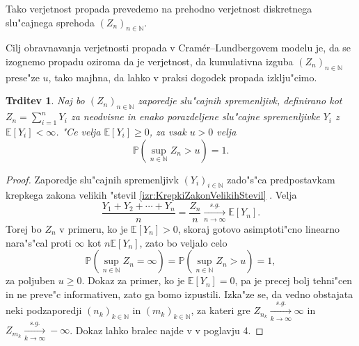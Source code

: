 \documentclass[12pt, a4paper, reqno]{amsart}
\theoremstyle{definition}
\theoremstyle{plain}
\newtheorem{trditev}[definicija]{Trditev}
\newcommand{\N}{\mathbb{N}}
\newcommand{\E}{\mathbb{E}}
\newcommand{\Prob}{\mathbb{P}}
\newcommand{\1}{\mathds{1}}
\newcommand*{\refPriloga}[1]{%
  \begingroup
    \hypersetup{
      linkcolor=red,
      linkbordercolor=red,
    }%
    \ref{#1}%
  \endgroup
}
\begin{document}
        Tako verjetnost propada prevedemo na prehodno verjetnost diskretnega slu"cajnega 
        sprehoda $(Z_n)_{n\in\N}$.
        
        Cilj obravnavanja verjetnosti propada v 
        Cramér--Lundbergovem modelu je, da se izognemo propadu oziroma da je verjetnost, 
        da kumulativna izguba $(Z_n)_{n\in\N}$ prese"ze $u$,
        tako majhna, da lahko v praksi dogodek propada izklju"cimo. 

        \begin{trditev}
            Naj bo $(Z_n)_{n\in\N}$ zaporedje slu"cajnih spremenljivk, definirano kot 
            $Z_n = \sum_{i=1}^nY_i$ za neodvisne in enako porazdeljene slu"cajne spremenljivke 
            $Y_i$ z $\E\left[Y_i\right] < \infty$. 
            "Ce velja $\E\left[Y_i\right] \geq 0$, za vsak $u>0$ velja
            \begin{equation*}
                \Prob\left(\sup_{n\in\N}Z_n > u\right) = 1.
            \end{equation*}
            \label{trd:propadZVerjetnostjo1}
        \end{trditev}

        \begin{proof}
            Zaporedje slu"cajnih spremenljivk $(Y_i)_{i\in\N}$ zado"s"ca predpostavkam krepkega zakona
            velikih "stevil \refPriloga{izr:KrepkiZakonVelikihStevil}. Velja
            \begin{equation*}
                \frac{Y_1 + Y_2 + \cdots + Y_n}{n} = \frac{Z_n}{n} \xrightarrow[n\to\infty]{s.g.} \E\left[Y_n\right].
            \end{equation*}
            Torej bo $Z_n$ v primeru, ko je $\E\left[Y_n\right]>0$, 
             skoraj gotovo asimptoti"cno linearno nara"s"cal proti $\infty$ kot $n \E\left[Y_n\right]$, 
            zato bo veljalo celo
            \begin{equation*}
                \Prob\left(\sup_{n\in\N}Z_n = \infty\right) = \Prob\left(\sup_{n\in\N}Z_n > u\right) = 1,
            \end{equation*}
            za poljuben $u\geq 0$. Dokaz za primer, ko je $\E\left[Y_n\right] = 0$, pa
            je precej bolj tehni"cen in ne preve"c informativen, zato 
            ga bomo izpustili. Izka"ze se, da vedno obstajata neki podzaporedji $(n_k)_{k\in\N}$ in $(m_k)_{k\in\N}$, 
            za kateri gre
            $Z_{n_k} \xrightarrow[k\to\infty]{s.g.}\infty$ in 
            $Z_{m_k} \xrightarrow[k\to\infty]{s.g.}-\infty$.
            Dokaz lahko bralec najde v \cite{6} v poglavju 4.
        \end{proof}
\end{document}
